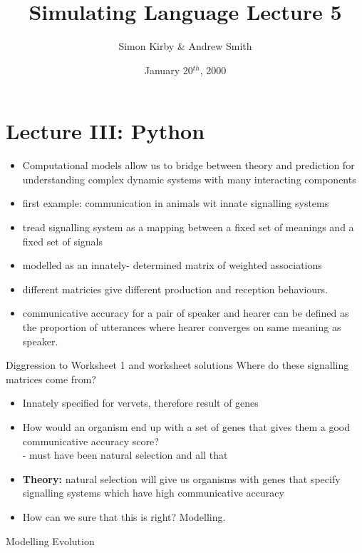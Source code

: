 \documentclass[11pt]{amsart}
\title{Simulating Language Lecture 5}
\author{Simon Kirby \& Andrew Smith}
\date{January 20$^{th}$, 2000}
\begin{document}
\maketitle
\section{Lecture III: Python}
\begin{itemize}
\item Computational models allow us to bridge between theory and prediction for understanding complex dynamic systems with many interacting components
\item first example: communication in animals wit innate signalling systems
\item tread signalling system as a mapping between a fixed set of meanings and a fixed set of signals %
\item modelled as an innately- determined matrix of weighted associations
\item different matricies give different production and reception behaviours. 
\item communicative accuracy for a pair of speaker and hearer can be defined as the proportion of utterances where hearer converges on same meaning as speaker. %
\end{itemize}
Diggression to Worksheet 1 and worksheet solutions
Where do these signalling matrices come from?
\begin{itemize}
\item Innately specified for vervets, therefore result of genes
\item How would an organism end up with a set of genes that gives them a good communicative accuracy score?\\
	- must have been natural selection and all that
\item {\bf Theory:} natural selection will give us organisms with genes that specify signalling systems which have high communicative accuracy
\item How can we sure that this is right? Modelling. 
\end{itemize}
Modelling Evolution
\end{document}
